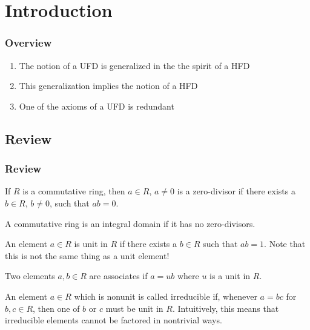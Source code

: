\section{Introduction}

\begin{frame}
  \frametitle{Overview}
  \begin{enumerate}
    \item<1-> The notion of a UFD is generalized in the the spirit of a HFD
    \item<2-> This generalization implies the notion of a HFD
    \item<3-> One of the axioms of a UFD is redundant    
  \end{enumerate}
\end{frame}

\subsection{Review}

\begin{frame}
  \frametitle{Review}
  \begin{definition}
    If $R$ is a commutative ring, then $a \in R$, $a \neq 0$ is a \alert{zero-divisor} if there exists a $b \in R$, $b \neq 0$, such that $a b = 0$.
  \end{definition}
  \pause
  \begin{definition}
    A commutative ring is an \alert{integral domain} if it has no zero-divisors.
  \end{definition}
\end{frame}
\begin{frame}
  \begin{definition}
    An element $a \in R$ is \alert{unit in $R$} if there exists a $b \in R$ such that $ab = 1$.
    Note that this is not the same thing as a unit element!
  \end{definition}
  \pause
  \begin{definition}
    Two elements $a, b \in R$ are \alert{associates} if $a = ub$ where $u$ is a unit in $R$.
  \end{definition}
  \pause
  \begin{definition}
    An element $a \in R$ which is nonunit is called \alert{irreducible} if, whenever $a = bc$ for $b, c \in R$, then one of $b$ or $c$ must be unit in $R$.
    Intuitively, this means that irreducible elements cannot be factored in nontrivial ways.
  \end{definition}
\end{frame}

